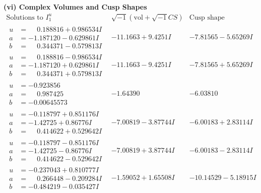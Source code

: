 \documentclass[1p]{elsarticle_modified}
\theoremstyle{definition}
\newcommand{\I}{\sqrt{-1}}
\begin{document}
\newpage\flushleft \textbf{(vi) Complex Volumes and Cusp Shapes}
$$\begin{array}{c|c|c}  
\text{Solutions to }I^u_{1}& \I (\text{vol} + \sqrt{-1}CS) & \text{Cusp shape}\\
 \hline 
\begin{aligned}
u &= \phantom{-}0.188816 + 0.986534 I \\
a &= -1.187120 - 0.629861 I \\
b &= \phantom{-}0.344371 - 0.579813 I\end{aligned}
 & -11.1663 + 9.4251 I & -7.81565 - 5.65269 I \\ \hline\begin{aligned}
u &= \phantom{-}0.188816 - 0.986534 I \\
a &= -1.187120 + 0.629861 I \\
b &= \phantom{-}0.344371 + 0.579813 I\end{aligned}
 & -11.1663 - 9.4251 I & -7.81565 + 5.65269 I \\ \hline\begin{aligned}
u &= -0.923856\phantom{ +0.000000I} \\
a &= \phantom{-}0.987425\phantom{ +0.000000I} \\
b &= -0.00645573\phantom{ +0.000000I}\end{aligned}
 & -1.64390\phantom{ +0.000000I} & -6.03810\phantom{ +0.000000I} \\ \hline\begin{aligned}
u &= -0.118797 + 0.851176 I \\
a &= -1.42725 + 0.86776 I \\
b &= \phantom{-}0.414622 + 0.529642 I\end{aligned}
 & -7.00819 - 3.87744 I & -6.00183 + 2.83114 I \\ \hline\begin{aligned}
u &= -0.118797 - 0.851176 I \\
a &= -1.42725 - 0.86776 I \\
b &= \phantom{-}0.414622 - 0.529642 I\end{aligned}
 & -7.00819 + 3.87744 I & -6.00183 - 2.83114 I \\ \hline\begin{aligned}
u &= -0.237043 + 0.810777 I \\
a &= \phantom{-}0.266448 - 0.209284 I \\
b &= -0.484219 - 0.035427 I\end{aligned}
 & -1.59052 + 1.65508 I & -10.14529 - 5.18915 I \\ \hline\begin{aligned}

\end{aligned}
\end{array}$$
\end{document}
